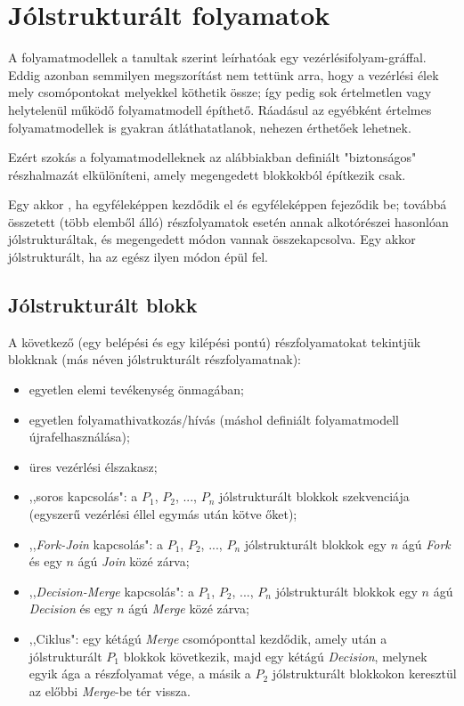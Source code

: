 \section{Jólstrukturált folyamatok}\label{sec:jolstrukturalt-folyamatok}

A folyamatmodellek a tanultak szerint leírhatóak egy vezérlésifolyam-gráffal. Eddig azonban semmilyen megszorítást nem tettünk arra, hogy a vezérlési élek mely csomópontokat melyekkel köthetik össze; így pedig sok értelmetlen vagy helytelenül működő folyamatmodell építhető. Ráadásul az egyébként értelmes folyamatmodellek is gyakran átláthatatlanok, nehezen érthetőek lehetnek. 

Ezért szokás a folyamatmodelleknek az alábbiakban definiált "biztonságos" részhalmazát elkülöníteni, amely megengedett blokkokból építkezik csak. 

\begin{definicio}
	Egy  akkor , ha egyféleképpen kezdődik el és egyféleképpen fejeződik be; továbbá összetett (több elemből álló) részfolyamatok esetén annak alkotórészei hasonlóan jólstrukturáltak, és megengedett módon vannak összekapcsolva. Egy  akkor jólstrukturált, ha az egész ilyen módon épül fel.
\end{definicio}

\subsection{Jólstrukturált blokk}

A következő (egy belépési és egy kilépési pontú) részfolyamatokat tekintjük  blokknak (más néven jólstrukturált részfolyamatnak):

\begin{itemize}
\item egyetlen elemi tevékenység önmagában;
\item egyetlen folyamathivatkozás/hívás (máshol definiált folyamatmodell újrafelhasználása);
\item üres vezérlési élszakasz;
\item ,,soros kapcsolás": a $P_1$, $P_2$, ..., $P_n$ jólstrukturált blokkok szekvenciája (egyszerű vezérlési éllel egymás után kötve őket);
\item ,,\emph{Fork-Join} kapcsolás": a $P_1$, $P_2$, ..., $P_n$ jólstrukturált blokkok egy $n$ ágú \emph{Fork} és egy $n$ ágú \emph{Join} közé zárva; 
\item ,,\emph{Decision-Merge} kapcsolás": a $P_1$, $P_2$, ..., $P_n$ jólstrukturált blokkok egy $n$ ágú \emph{Decision} és egy $n$ ágú \emph{Merge} közé zárva;
\item ,,Ciklus": egy kétágú \emph{Merge} csomóponttal kezdődik, amely után a jólstrukturált $P_1$ blokkok következik, majd egy kétágú \emph{Decision}, melynek egyik ága a részfolyamat vége, a másik a $P_2$ jólstrukturált blokkokon keresztül az előbbi \emph{Merge}-be tér vissza.
\end{itemize}

